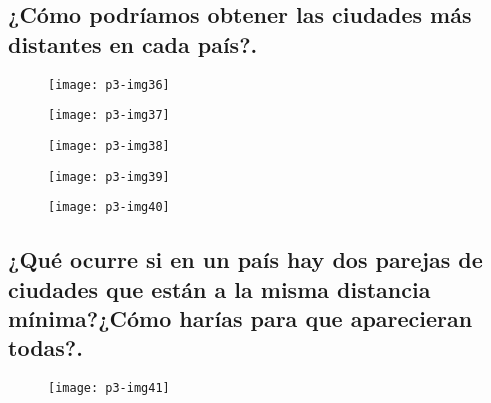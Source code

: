 \documentclass[10pt]{article}
\begin{document}
\subsection{¿Cómo podríamos obtener las ciudades más distantes en cada país?.}

\begin{figure}[H]
	\begin{center}
 		\texttt{[image: p3-img36]}
	\end{center} 
\end{figure}

\begin{figure}[H]
	\begin{center}
 		\texttt{[image: p3-img37]}
	\end{center} 
\end{figure}

\begin{figure}[H]
	\begin{center}
 		\texttt{[image: p3-img38]}
	\end{center} 
\end{figure}

\begin{figure}[H]
	\begin{center}
 		\texttt{[image: p3-img39]}
	\end{center} 
\end{figure}

\begin{figure}[H]
	\begin{center}
 		\texttt{[image: p3-img40]}
	\end{center} 
\end{figure}


\subsection{¿Qué ocurre si en un país hay dos parejas de ciudades que están a la misma distancia mínima?¿Cómo harías para que aparecieran todas?.}

\begin{figure}[H]
	\begin{center}
 		\texttt{[image: p3-img41]}
	\end{center} 
\end{figure}
\end{document}
